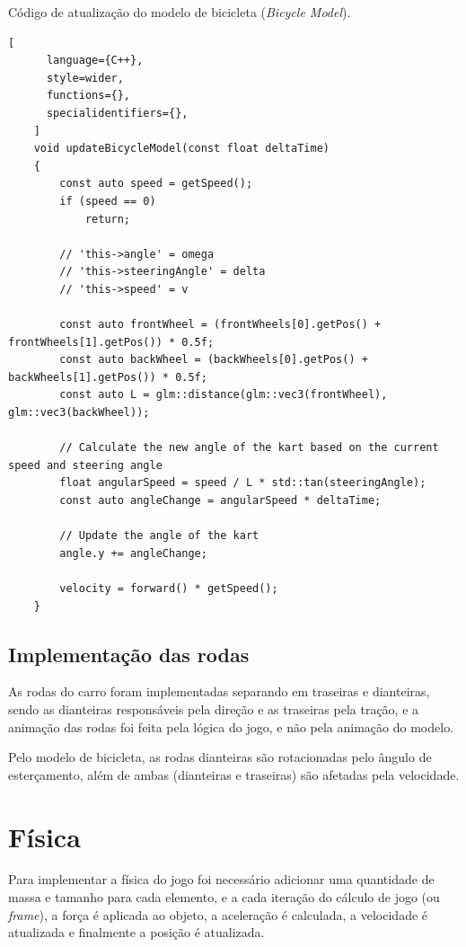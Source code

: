 \begin{programruledcaption}{Código de atualização do modelo de bicicleta (\textit{Bicycle Model}).\label{prog:bicycle}}
    \begin{lstlisting}[
      language={C++},
      style=wider,
      functions={},
      specialidentifiers={},
    ]
    void updateBicycleModel(const float deltaTime)
    {
        const auto speed = getSpeed();
        if (speed == 0)
            return;
    
        // 'this->angle' = omega
        // 'this->steeringAngle' = delta
        // 'this->speed' = v
    
        const auto frontWheel = (frontWheels[0].getPos() + frontWheels[1].getPos()) * 0.5f;
        const auto backWheel = (backWheels[0].getPos() + backWheels[1].getPos()) * 0.5f;
        const auto L = glm::distance(glm::vec3(frontWheel), glm::vec3(backWheel));
    
        // Calculate the new angle of the kart based on the current speed and steering angle
        float angularSpeed = speed / L * std::tan(steeringAngle);
        const auto angleChange = angularSpeed * deltaTime;
    
        // Update the angle of the kart
        angle.y += angleChange;
    
        velocity = forward() * getSpeed();
    }
    \end{lstlisting}
\end{programruledcaption}

\subsection{Implementação das rodas}

As rodas do carro foram implementadas separando em traseiras e dianteiras, sendo as dianteiras responsáveis pela direção e as traseiras pela tração, e a animação das rodas foi feita pela lógica do jogo, e não pela animação do modelo.

Pelo modelo de bicicleta, as rodas dianteiras são rotacionadas pelo ângulo de esterçamento, além de ambas (dianteiras e traseiras) são afetadas pela velocidade.

\section{Física}

Para implementar a física do jogo foi necessário adicionar uma quantidade de massa e tamanho para cada elemento, e a cada iteração do cálculo de jogo (ou \textit{frame}), a força é aplicada ao objeto, a aceleração é calculada, a velocidade é atualizada e finalmente a posição é atualizada.

